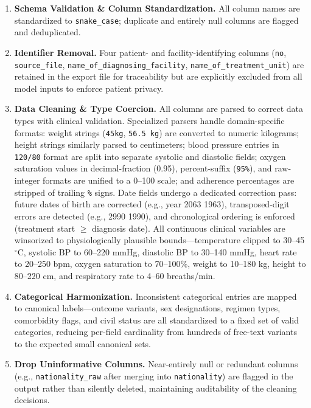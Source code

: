 \documentclass[12pt]{article}
\begin{document}
\begin{enumerate}[noitemsep, topsep=2pt]
  \item \textbf{Schema Validation \& Column Standardization.} All column names are standardized to \texttt{snake\_case}; duplicate and entirely null columns are flagged and deduplicated.
  \item \textbf{Identifier Removal.} Four patient- and facility-identifying columns (\texttt{no}, \texttt{source\_file}, \texttt{name\_of\_diagnosing\_facility}, \texttt{name\_of\_treatment\_unit}) are retained in the export file for traceability but are explicitly excluded from all model inputs to enforce patient privacy.
  \item \textbf{Data Cleaning \& Type Coercion.} All columns are parsed to correct data types with clinical validation. Specialized parsers handle domain-specific formats: weight strings (\texttt{45kg}, \texttt{56.5 kg}) are converted to numeric kilograms; height strings similarly parsed to centimeters; blood pressure entries in \texttt{120/80} format are split into separate systolic and diastolic fields; oxygen saturation values in decimal-fraction (0.95), percent-suffix (\texttt{95\%}), and raw-integer formats are unified to a 0--100 scale; and adherence percentages are stripped of trailing \texttt{\%} signs. Date fields undergo a dedicated correction pass: future dates of birth are corrected (e.g., year 2063 \textrightarrow{} 1963), transposed-digit errors are detected (e.g., 2990 \textrightarrow{} 1990), and chronological ordering is enforced (treatment start $\geq$ diagnosis date). All continuous clinical variables are winsorized to physiologically plausible bounds---temperature clipped to 30--45$^\circ$C, systolic BP to 60--220 mmHg, diastolic BP to 30--140 mmHg, heart rate to 20--250 bpm, oxygen saturation to 70--100\%, weight to 10--180 kg, height to 80--220 cm, and respiratory rate to 4--60 breaths/min.
  \item \textbf{Categorical Harmonization.} Inconsistent categorical entries are mapped to canonical labels---outcome variants, sex designations, regimen types, comorbidity flags, and civil status are all standardized to a fixed set of valid categories, reducing per-field cardinality from hundreds of free-text variants to the expected small canonical sets.
  \item \textbf{Drop Uninformative Columns.} Near-entirely null or redundant columns (e.g., \texttt{nationality\_raw} after merging into \texttt{nationality}) are flagged in the output rather than silently deleted, maintaining auditability of the cleaning decisions.

\end{enumerate}
\end{document}
